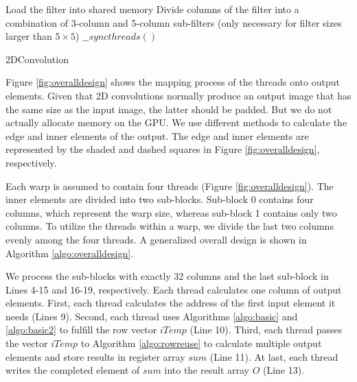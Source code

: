 \begin{algorithm}
	Load the filter into shared memory\;
	Divide columns of the filter into a combination of 3-column and 5-column sub-filters (only necessary for filter sizes larger than $5 \times 5$)\;
	$\_\_syncthreads()$\;
	\caption{2DConvolution}
	\label{algo:overalldesign}
\end{algorithm}

Figure \ref{fig:overalldesign} shows the mapping process of the threads onto output elements. Given that 2D convolutions normally produce an output image that has the same size as the input image, the latter should be padded. But we do not actually allocate memory on the GPU. We use different methods to calculate the edge and inner elements of the output. The edge and inner elements are represented by the shaded and dashed squares in Figure \ref{fig:overalldesign}, respectively.

Each warp is assumed to contain four threads (Figure \ref{fig:overalldesign}). The inner elements are divided into two
sub-blocks. Sub-block 0 contains four columns, which represent the warp size, whereas sub-block 1 contains only two columns. To utilize the threads within a warp, we divide the last two columns evenly among the four threads. A generalized overall design is shown in Algorithm \ref{algo:overalldesign}.

We process the sub-blocks with exactly 32 columns and the last sub-block in Lines 4-15 and 16-19, respectively. Each thread calculates one column of output elements. First, each thread calculates the address of the first input element it needs (Lines 9). Second, each thread uses Algorithms \ref{algo:basic} and \ref{algo:basic2} to fulfill the row vector $iTemp$ (Line 10). Third, each thread passes the
vector $iTemp$ to Algorithm \ref{algo:rowreuse} to calculate multiple output elements and store results in register array $sum$ (Line 11).
At last, each thread writes the completed element of $sum$ into the result array $O$ (Line 13).


